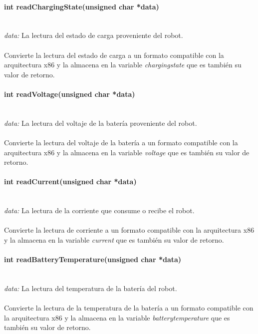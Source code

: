 \documentclass[letterpaper,openright,12pt]{book}
\begin{document}
\paragraph{int readChargingState(unsigned char *data)}\mbox{}\\
\emph{data: }La lectura del estado de carga proveniente del robot.\\\\
Convierte la lectura del estado de carga a un formato compatible con la arquitectura x86 y la almacena en la variable \emph{chargingstate} que es también su valor de retorno.\\ 

\paragraph{int readVoltage(unsigned char *data)}\mbox{}\\
\emph{data: }La lectura del voltaje de la batería proveniente del robot.\\\\
Convierte la lectura del voltaje de la batería a un formato compatible con la arquitectura x86 y la almacena en la variable \emph{voltage} que es también su valor de retorno.\\ 

\paragraph{int readCurrent(unsigned char *data)}\mbox{}\\
\emph{data: }La lectura de la corriente que consume o recibe el robot.\\\\
Convierte la lectura de corriente a un formato compatible con la arquitectura x86 y la almacena en la variable \emph{current} que es también su valor de retorno.\\ 

\paragraph{int readBatteryTemperature(unsigned char *data)}\mbox{}\\
\emph{data: }La lectura del temperatura de la batería del robot.\\\\
Convierte la lectura de la temperatura de la batería a un formato compatible con la arquitectura x86 y la almacena en la variable \emph{batterytemperature} que es también su valor de retorno.\\ 
\end{document}
